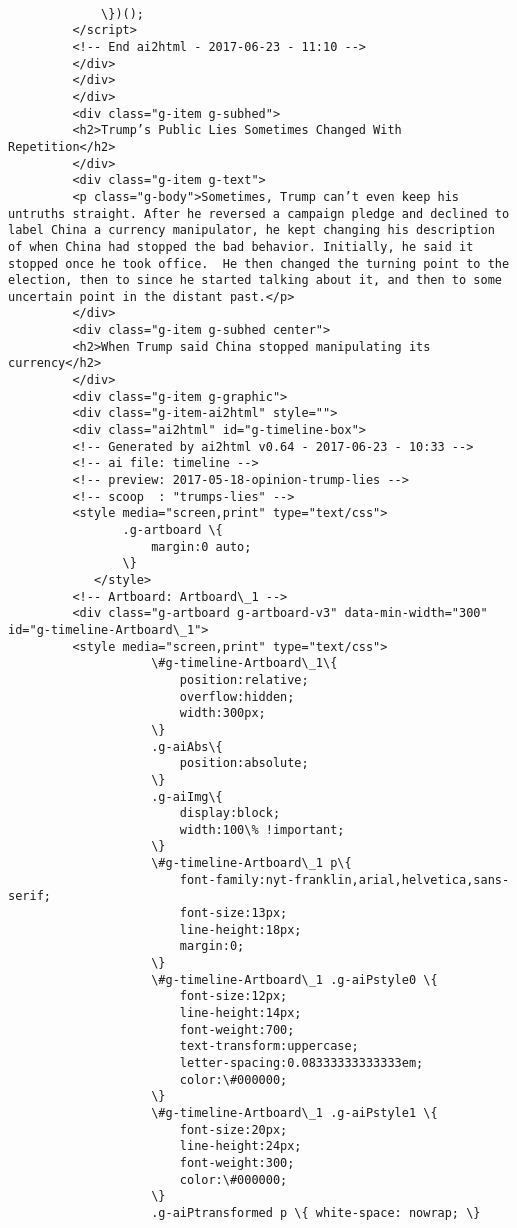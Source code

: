 \documentclass[11pt]{article}
\begin{document}
\begin{Verbatim}[commandchars=\\\{\}]
                
             \})();
         </script>
         <!-- End ai2html - 2017-06-23 - 11:10 -->
         </div>
         </div>
         </div>
         <div class="g-item g-subhed">
         <h2>Trump’s Public Lies Sometimes Changed With Repetition</h2>
         </div>
         <div class="g-item g-text">
         <p class="g-body">Sometimes, Trump can’t even keep his untruths straight. After he reversed a campaign pledge and declined to label China a currency manipulator, he kept changing his description of when China had stopped the bad behavior. Initially, he said it stopped once he took office.  He then changed the turning point to the election, then to since he started talking about it, and then to some uncertain point in the distant past.</p>
         </div>
         <div class="g-item g-subhed center">
         <h2>When Trump said China stopped manipulating its currency</h2>
         </div>
         <div class="g-item g-graphic">
         <div class="g-item-ai2html" style="">
         <div class="ai2html" id="g-timeline-box">
         <!-- Generated by ai2html v0.64 - 2017-06-23 - 10:33 -->
         <!-- ai file: timeline -->
         <!-- preview: 2017-05-18-opinion-trump-lies -->
         <!-- scoop  : "trumps-lies" -->
         <style media="screen,print" type="text/css">
         		.g-artboard \{
         			margin:0 auto;
         		\}
         	</style>
         <!-- Artboard: Artboard\_1 -->
         <div class="g-artboard g-artboard-v3" data-min-width="300" id="g-timeline-Artboard\_1">
         <style media="screen,print" type="text/css">
         			\#g-timeline-Artboard\_1\{
         				position:relative;
         				overflow:hidden;
         				width:300px;
         			\}
         			.g-aiAbs\{
         				position:absolute;
         			\}
         			.g-aiImg\{
         				display:block;
         				width:100\% !important;
         			\}
         			\#g-timeline-Artboard\_1 p\{
         				font-family:nyt-franklin,arial,helvetica,sans-serif;
         				font-size:13px;
         				line-height:18px;
         				margin:0;
         			\}
         			\#g-timeline-Artboard\_1 .g-aiPstyle0 \{
         				font-size:12px;
         				line-height:14px;
         				font-weight:700;
         				text-transform:uppercase;
         				letter-spacing:0.08333333333333em;
         				color:\#000000;
         			\}
         			\#g-timeline-Artboard\_1 .g-aiPstyle1 \{
         				font-size:20px;
         				line-height:24px;
         				font-weight:300;
         				color:\#000000;
         			\}
         			.g-aiPtransformed p \{ white-space: nowrap; \}

\end{Verbatim}
\end{document}
